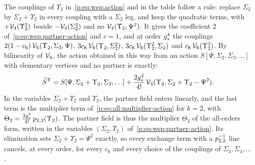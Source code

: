 The couplings of $\Upsilon_2$ in~\eqref{p:eq:wsp:action} and in the table follow a rule: replace $\Sigma_2$ by $\Sigma_2 + \Upsilon_2$ in every coupling with a $\Sigma_2$ leg, and keep the quadratic terms, with $+ \mathcal{V}_{4}(\Upsilon_2^2)$ beside $- \mathcal{V}_{4}(\Sigma_2^2)$ and no $\mathcal{V}_{4}(\Upsilon_2, \Psi^2)$.
  It gives the coefficient $2$ of~\eqref{p:eq:wsp:partner-action} and $c = 1$, and at order $g_s^4$ the couplings $2 (1 - c_6) \, \mathcal{V}_{6}(\Upsilon_2, \Sigma_3, \Psi)$, $3 c_6 \, \mathcal{V}_{6}(\Upsilon_2, \Sigma_2^2)$, $3 c_6 \, \mathcal{V}_{6}(\Upsilon_2^2, \Sigma_2)$ and $c_6 \, \mathcal{V}_{6}(\Upsilon_2^3)$.
  By bilinearity of $\mathcal{V}_{4}$, the action obtained in this way from an action $S[\Psi, \Sigma_2, \Sigma_3, \ldots]$ with elementary vertices and no partner is exactly:
  \begin{equation}
  \label{p:eq:wsp:rule}
  \widetilde{S}_{}^{\Upsilon}
    = S[\Psi, \Sigma_2 + \Upsilon_2, \Sigma_3, \ldots]
      + \frac{2 g_s^2}{4!} \, \mathcal{V}_{4}(\Upsilon_2, \Sigma_2 + \Upsilon_2 - \Psi^2).
\end{equation}
  In the variables $\Sigma_2 + \Upsilon_2$ and $\Upsilon_2$, the partner field enters linearly, and the last term is the multiplier term of~\eqref{p:eq:all:multiplier-action} for $k = 2$, with $\Theta_2 = \frac{2 g_s^2}{4!} \, p_{2,2}(\Upsilon_2)$.
  The partner field is thus the multiplier $\Theta_2$ of the all-orders form, written in the variables $(\Sigma_2, \Upsilon_2)$ of~\eqref{p:eq:wsp:partner-action}.
  Its elimination sets $\Sigma_2 + \Upsilon_2 = \Psi^2$ exactly, so every exchange term with a $p_{2,2}^{-1}$ line cancels, at every order, for every $c_6$ and every choice of the couplings of $\Sigma_3, \Sigma_4, \ldots$.

